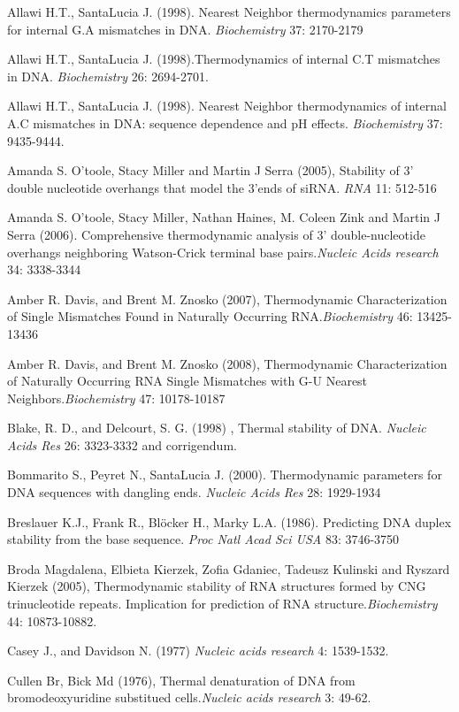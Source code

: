 \documentclass{article}
\begin{document}
Allawi H.T., SantaLucia J. (1998). Nearest Neighbor thermodynamics parameters 
for internal G.A mismatches in DNA. \textit{Biochemistry} 37: 2170-2179

Allawi H.T., SantaLucia J. (1998).Thermodynamics of internal C.T mismatches in DNA.
\textit{Biochemistry} 26: 2694-2701.

Allawi H.T., SantaLucia J. (1998). Nearest Neighbor thermodynamics of internal 
A.C mismatches in DNA: sequence dependence and pH effects.
\textit{Biochemistry} 37: 9435-9444.

Amanda S. O'toole, Stacy Miller and Martin J Serra (2005), Stability of 3' double 
nucleotide overhangs that model the 3'ends of siRNA. \textit{RNA} 11: 512-516

Amanda S. O'toole, Stacy Miller, Nathan Haines, M. Coleen Zink and Martin J Serra (2006). 
Comprehensive thermodynamic analysis of 3' double-nucleotide overhangs neighboring 
Watson-Crick terminal base pairs.\textit{Nucleic Acids research} 34: 3338-3344

Amber R. Davis, and Brent M. Znosko (2007), Thermodynamic Characterization of Single 
Mismatches Found in Naturally Occurring RNA.\textit{Biochemistry} 46: 13425-13436

Amber R. Davis, and Brent M. Znosko (2008), Thermodynamic Characterization of Naturally 
Occurring RNA Single Mismatches with G-U Nearest Neighbors.\textit{Biochemistry} 
47: 10178-10187

Blake, R. D., and Delcourt, S. G. (1998) , Thermal stability of DNA.
\textit{Nucleic Acids Res} 26: 3323-3332 and corrigendum.

Bommarito S., Peyret N., SantaLucia J. (2000).  Thermodynamic parameters for DNA
sequences with dangling ends.  \textit{Nucleic Acids Res} 28: 1929-1934

  Breslauer K.J., Frank R., Bl\"ocker 
H., Marky L.A. (1986). Predicting DNA duplex stability from the base sequence. 
 \textit{Proc Natl Acad Sci USA}  83: 3746-3750   

Broda Magdalena, Elbieta Kierzek, Zofia Gdaniec, Tadeusz Kulinski and Ryszard 
Kierzek (2005), Thermodynamic stability of RNA structures formed by CNG trinucleotide 
repeats. Implication for prediction of RNA structure.\textit{Biochemistry} 
44: 10873-10882.

Casey J., and Davidson N. (1977) \textit{Nucleic acids research} 4: 1539-1532.

Cullen Br, Bick Md (1976), Thermal denaturation of DNA from bromodeoxyuridine 
substitued cells.\textit{Nucleic acids research} 3: 49-62.
\end{document}
